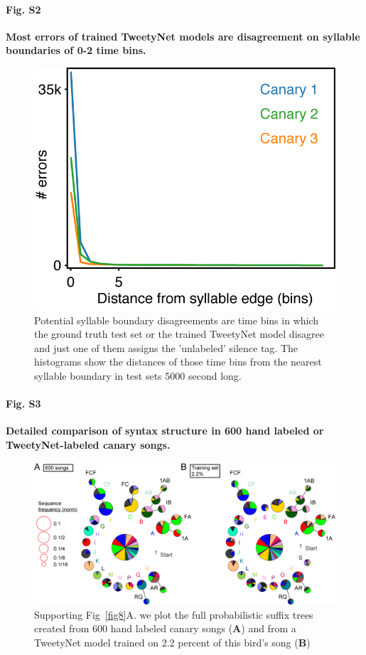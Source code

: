 \documentclass[10pt,letterpaper]{article}
\begin{document}
\paragraph*{Fig. S2}
\label{S2_Fig}
{\bf Most errors of trained TweetyNet models are disagreement on syllable boundaries of 0-2 time bins.}
\begin{figure}[!ht]
\includegraphics[scale=1.0]{Figures/Supplementaries/EdgeErrorDistCanaries.png}
\caption{Potential syllable boundary disagreements are time bins in which the ground truth test set or the trained TweetyNet model disagree and just one of them assigns the 'unlabeled' silence tag. The histograms show the distances of those time bins from the nearest syllable boundary in test sets 5000 second long.}
\label{supp_fig_2}
\end{figure}

\paragraph*{Fig. S3}
\label{S3_Fig}
{\bf Detailed comparison of syntax structure in 600 hand labeled or TweetyNet-labeled canary songs.}
\begin{figure}[!ht]
\includegraphics[scale=0.85]{Figures/fig8/Figure8_v7.png}
\caption{Supporting Fig~\ref{fig8}A. we plot the full probabilistic suffix trees created from 600 hand labeled canary songs ({\bf A}) and from a TweetyNet model trained on 2.2 percent of this bird's song ({\bf B})}
\label{supp_fig_3}
\end{figure}
\end{document}
